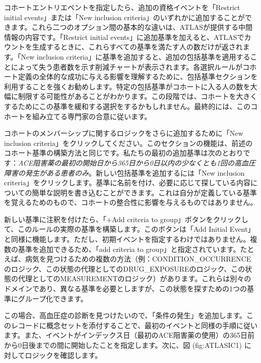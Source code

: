 \documentclass[
  11pt]{book}
\theoremstyle{definition}
\theoremstyle{definition}
\theoremstyle{definition}
\theoremstyle{definition}
\theoremstyle{remark}
\begin{document}
コホートエントリエベントを指定したら、追加の資格イベントを「Restrict initial events」または「New inclusion criteria」のいずれかに追加することができます。これら二つのオプション間の基本的な違いは、ATLASが提供する中間情報の内容です。「Restrict initial events」に追加基準を加えると、ATLASでカウントを生成するときに、これらすべての基準を満たす人の数だけが返されます。「New inclusion criteria」に基準を追加すると、追加の包括基準を適用することによって失う患者数を示す削減チャートが表示されます。各選択ルールがコホート定義の全体的な成功に与える影響を理解するために、包括基準セクションを利用することを強くお勧めします。特定の包括基準がコホートに入る人の数を大幅に制限する可能性があることがわかります。この段階では、コホートを大きくするためにこの基準を緩和する選択をするかもしれません。最終的には、このコホートを組み立てる専門家の合意に従います。

コホートのメンバーシップに関するロジックをさらに追加するために「New inclusion criteria」をクリックしてください。このセクションの機能は、前述のコホート基準の構築方法と同じです。私たちの最初の追加基準は次のとおりです：\emph{ACE阻害薬の最初の開始日から365日から0日以内の少なくとも1回の高血圧障害の発生がある患者のみ}。新しい包括基準を追加するには「New inclusion criteria」をクリックします。基準に名前を付け、必要に応じて探している内容についての簡単な説明を書き込むことができます。これは自分が定義している基準を覚えるためのもので、コホートの整合性に影響を与えるものではありません。

新しい基準に注釈を付けたら、「+Add criteria to group」ボタンをクリックして、このルールの実際の基準を構築します。このボタンは「Add Initial Event」と同様に機能します。ただし、初期イベントを指定するわけではありません。複数の基準を追加できるため、「add criteria to group」と指定されています。たとえば、病気を見つけるための複数の方法（例：CONDITION\_OCCURRENCEのロジック、この状態の代理としてのDRUG\_EXPOSUREのロジック、この状態の代理としてのMEASUREMENTのロジック）があります。これらは別々のドメインであり、異なる基準を必要としますが、この状態を探すための1つの基準にグループ化できます。

この場合、高血圧症の診断を見つけたいので、「条件の発生」を追加します。このレコードに概念セットを添付することで、最初のイベントと同様の手順に従います。また、イベントがインデックス日（最初のACE阻害薬の使用）の365日前から0日後までの間に開始したことを指定します。次に、図 \citet{ref}(fig:ATLASIC1) に対してロジックを確認します。
\end{document}
